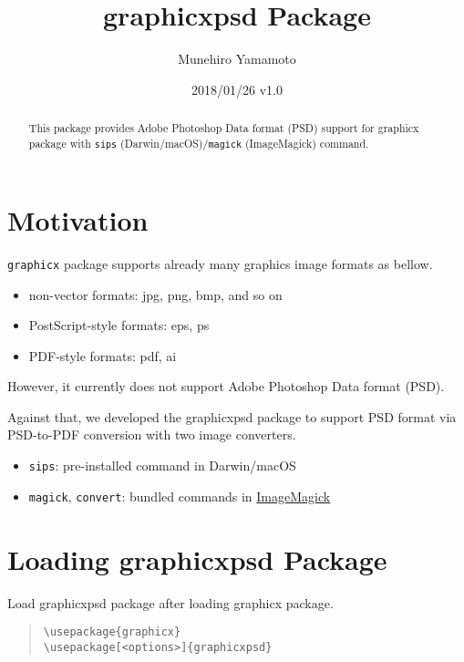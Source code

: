 \documentclass[luatex]{article}
\title{\textsf{graphicxpsd} Package}
\author{Munehiro Yamamoto}
\date{2018/01/26 v1.0}
\begin{document}
\maketitle
\begin{abstract}
This package provides Adobe Photoshop Data format (PSD) support 
for \textsf{graphicx} package
with \texttt{sips} (Darwin/macOS)/\texttt{magick} (ImageMagick) command.
\end{abstract}

\section{Motivation}
\texttt{graphicx} package supports already many graphics image formats as bellow. 
\begin{itemize}
\item non-vector formats: jpg, png, bmp, and so on
\item PostScript-style formats: eps, ps
\item PDF-style formats: pdf, ai
\end{itemize}
However, it currently does not support Adobe Photoshop Data format (PSD). 

Against that, we developed the \textsf{graphicxpsd} package 
to support PSD format via PSD-to-PDF conversion 
with two image converters.
\begin{itemize}
\item \texttt{sips}: 
pre-installed command in Darwin/macOS

\item \texttt{magick}, \texttt{convert}: 
bundled commands in \href{https://www.imagemagick.org/}{ImageMagick}
\end{itemize}

\section{Loading \textsf{graphicxpsd} Package}

Load \textsf{graphicxpsd} package after loading \textsf{graphicx} package.

\begin{quote}
\begin{verbatim}
\usepackage{graphicx}
\usepackage[<options>]{graphicxpsd}
\end{verbatim}
\end{quote}
\end{document}
